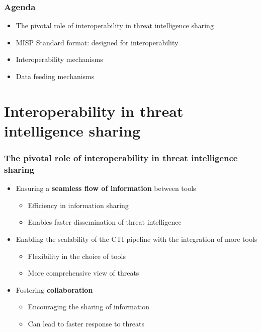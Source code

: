 
\begin{frame}[t,plain]
\titlepage
\end{frame}

\begin{frame}
	\frametitle{Agenda}
	\begin{itemize}
        \item The pivotal role of interoperability in threat intelligence sharing
		\item MISP Standard format: designed for interoperability
		\item Interoperability mechanisms
        \item Data feeding mechanisms
	\end{itemize}
\end{frame}

\section{Interoperability in threat \\ intelligence sharing}

\begin{frame}
    \frametitle{The pivotal role of interoperability in threat intelligence sharing}
    \begin{itemize}
        \item Ensuring a \textbf{seamless flow of information} between tools
        \begin{itemize}
            \item Efficiency in information sharing
            \item Enables faster dissemination of threat intelligence
        \end{itemize}
        \item Enabling the scalability of the CTI pipeline with the integration of more tools
        \begin{itemize}
            \item Flexibility in the choice of tools
            \item More comprehensive view of threats
        \end{itemize}
        \item Fostering \textbf{collaboration}
        \begin{itemize}
            \item Encouraging the sharing of information
            \item Can lead to faster response to threats
        \end{itemize}
    \end{itemize}
\end{frame}

